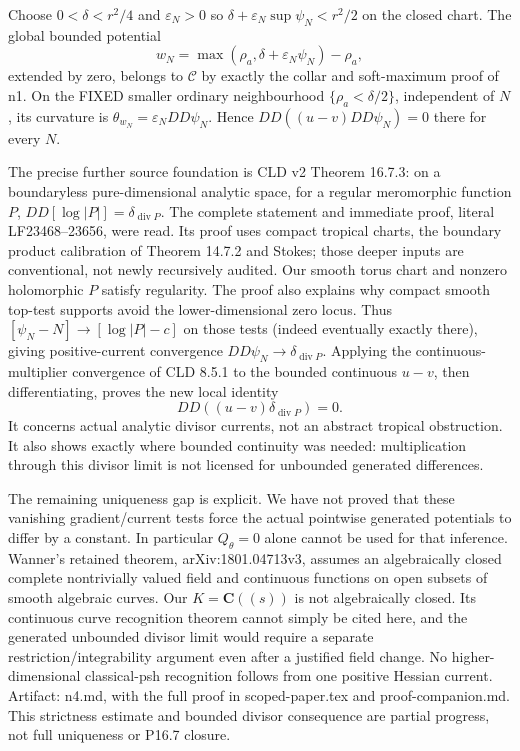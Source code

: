 \documentclass[11pt]{article}
\begin{document}
Choose $0<\delta<r^2/4$ and $\varepsilon_N>0$ so $\delta+\varepsilon_N\sup\psi_N<r^2/2$ on the closed chart. The global bounded potential
\[
 w_N=\max(\rho_a,\delta+\varepsilon_N\psi_N)-\rho_a,
\]
extended by zero, belongs to $\mathcal C$ by exactly the collar and soft-maximum proof of n1. On the FIXED smaller ordinary neighbourhood $\{\rho_a<\delta/2\}$, independent of $N$, its curvature is $\theta_{w_N}=\varepsilon_N DD\psi_N$. Hence $DD((u-v)DD\psi_N)=0$ there for every $N$.

The precise further source foundation is CLD v2 Theorem 16.7.3: on a boundaryless pure-dimensional analytic space, for a regular meromorphic function $P$, $DD[\log|P|]=\delta_{\operatorname{div}P}$. The complete statement and immediate proof, literal LF23468--23656, were read. Its proof uses compact tropical charts, the boundary product calibration of Theorem 14.7.2 and Stokes; those deeper inputs are conventional, not newly recursively audited. Our smooth torus chart and nonzero holomorphic $P$ satisfy regularity. The proof also explains why compact smooth top-test supports avoid the lower-dimensional zero locus. Thus $[\psi_N-N]\to[\log|P|-c]$ on those tests (indeed eventually exactly there), giving positive-current convergence $DD\psi_N\to\delta_{\operatorname{div}P}$. Applying the continuous-multiplier convergence of CLD 8.5.1 to the bounded continuous $u-v$, then differentiating, proves the new local identity
\[
 DD((u-v)\delta_{\operatorname{div}P})=0.
\]
It concerns actual analytic divisor currents, not an abstract tropical obstruction. It also shows exactly where bounded continuity was needed: multiplication through this divisor limit is not licensed for unbounded generated differences.

The remaining uniqueness gap is explicit. We have not proved that these vanishing gradient/current tests force the actual pointwise generated potentials to differ by a constant. In particular $Q_\theta=0$ alone cannot be used for that inference. Wanner's retained theorem, arXiv:1801.04713v3, assumes an algebraically closed complete nontrivially valued field and continuous functions on open subsets of smooth algebraic curves. Our $K=\mathbf C((s))$ is not algebraically closed. Its continuous curve recognition theorem cannot simply be cited here, and the generated unbounded divisor limit would require a separate restriction/integrability argument even after a justified field change. No higher-dimensional classical-psh recognition follows from one positive Hessian current. Artifact: n4.md, with the full proof in scoped-paper.tex and proof-companion.md. This strictness estimate and bounded divisor consequence are partial progress, not full uniqueness or P16.7 closure.
\end{document}
